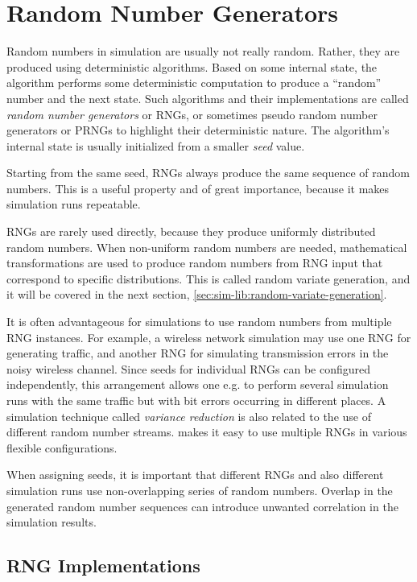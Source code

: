 \section{Random Number Generators}
\label{sec:sim-lib:random-number-generators}

Random numbers in simulation are usually not really random. Rather, they
are produced using deterministic algorithms. Based on some internal state,
the algorithm performs some deterministic computation to produce a
``random'' number and the next state. Such algorithms and their
implementations are called \textit{random number generators} or RNGs, or
sometimes pseudo random number generators or PRNGs to highlight their
deterministic nature. The algorithm's internal state is usually initialized
from a smaller \textit{seed} value.

Starting from the same seed, RNGs always produce the same sequence of
random numbers. This is a useful property and of great importance, because
it makes simulation runs repeatable.

RNGs are rarely used directly, because they produce uniformly distributed
random numbers. When non-uniform random numbers are needed, mathematical
transformations are used to produce random numbers from RNG input that
correspond to specific distributions. This is called random variate
generation, and it will be covered in the next section,
\ref{sec:sim-lib:random-variate-generation}.

It is often advantageous for simulations to use random numbers from
multiple RNG instances. For example, a wireless network simulation may use
one RNG for generating traffic, and another RNG for simulating transmission
errors in the noisy wireless channel. Since seeds for individual RNGs can
be configured independently, this arrangement allows one e.g. to perform
several simulation runs with the same traffic but with bit errors occurring
in different places. A simulation technique called \textit{variance
reduction} is also related to the use of different random number streams.
{\opp} makes it easy to use multiple RNGs in various flexible configurations.

When assigning seeds, it is important that different RNGs and also
different simulation runs use non-overlapping series of random numbers.
Overlap in the generated random number sequences can introduce unwanted
correlation in the simulation results.

\subsection{RNG Implementations}
\label{sec:sim-lib:rngs}

